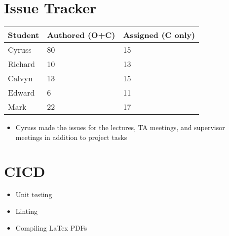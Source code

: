 \documentclass{article}
\begin{document}
\section{Issue Tracker}

\begin{table}[H]
\centering
\begin{tabular}{lll}
\toprule
\textbf{Student} & \textbf{Authored (O+C)} & \textbf{Assigned (C only)}\\
\midrule
Cyruss & 80 & 15 \\
Richard & 10 & 13 \\
Calvyn & 13 & 15 \\
Edward & 6 & 11 \\
Mark & 22 & 17 \\
\bottomrule
\end{tabular}
\end{table}

\begin{itemize}
    \item Cyruss made the issues for the lectures, TA meetings, and supervisor meetings in addition to project tasks
\end{itemize}

\section{CICD}

\begin{itemize}
    \item Unit testing
    \item Linting
    \item Compiling LaTex PDFs
\end{itemize}
\end{document}
